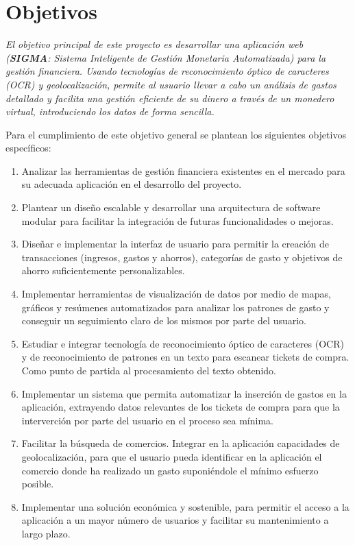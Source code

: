 \section{Objetivos} \label{sect:goals}
\textit{El objetivo principal de este proyecto es desarrollar una aplicación web (\textbf{SIGMA}: Sistema Inteligente de Gestión Monetaria Automatizada) 
para la gestión financiera. Usando tecnologías de reconocimiento
óptico de caracteres (OCR) y geolocalización, permite al usuario llevar a cabo un 
análisis de gastos detallado y facilita una gestión eficiente de su dinero
a través de un monedero virtual, introduciendo los datos de 
forma sencilla.}

Para el cumplimiento de este objetivo general se plantean los siguientes objetivos específicos:
\begin{enumerate}
    \item Analizar las herramientas de gestión financiera existentes en el mercado para su adecuada aplicación en el desarrollo del proyecto.  
    \item Plantear un diseño escalable y desarrollar una arquitectura de software modular para facilitar la integración de futuras funcionalidades o mejoras.
    \item Diseñar e implementar la interfaz de usuario para permitir la creación 
         de transacciones (ingresos, gastos y ahorros), categorías de gasto y objetivos de ahorro suficientemente personalizables. \label{obj:O3}
    \item Implementar herramientas de visualización de datos por medio de mapas, gráficos y resúmenes automatizados para analizar los patrones de gasto y conseguir un seguimiento claro de los mismos por parte del usuario.\label{obj:O4}
    \item Estudiar e integrar tecnología de reconocimiento óptico de caracteres (OCR) y de reconocimiento de patrones en un texto para escanear tickets de compra. Como punto de partida al procesamiento del texto obtenido. \label{obj:05}
    \item Implementar un sistema que permita automatizar la inserción de gastos en la aplicación, extrayendo datos relevantes de los tickets de compra para que la interverción por parte del usuario en el proceso sea mínima.\label{obj:06}
    \item Facilitar la búsqueda de comercios. Integrar en la aplicación capacidades de geolocalización, para que el usuario pueda identificar en la aplicación el comercio donde ha realizado un gasto suponiéndole el mínimo esfuerzo posible.\label{obj:O7}
    \item Implementar una solución económica y sostenible, para permitir el acceso a la aplicación a un mayor número de usuarios y facilitar su mantenimiento a largo plazo.\label{obj:O8}
\end{enumerate}